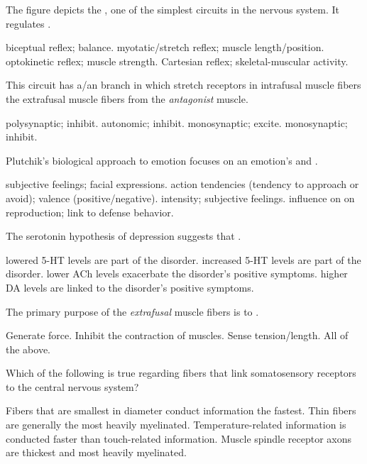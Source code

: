 \documentclass[answers]{exam}
\begin{document}
\begin{questions}

\question The figure depicts the \fillin, one of the simplest circuits in the nervous system. It regulates \fillin.
\begin{choices}
\choice biceptual reflex; balance.
\correctchoice myotatic/stretch reflex; muscle length/position.
\choice optokinetic reflex; muscle strength.
\choice Cartesian reflex; skeletal-muscular activity.
\end{choices}

\question This circuit has a/an \fillin branch in which stretch receptors in intrafusal muscle fibers \fillin the extrafusal muscle fibers from the \emph{antagonist} muscle.
\begin{choices}
\correctchoice polysynaptic; inhibit.
\choice autonomic; inhibit.
\choice monosynaptic; excite.
\choice monosynaptic; inhibit.
\end{choices}

\newpage

\question Plutchik's biological approach to emotion focuses on an emotion's \fillin and \fillin.
\begin{choices}
\choice subjective feelings; facial expressions.
\correctchoice action tendencies (tendency to approach or avoid); valence (positive/negative).
\choice intensity; subjective feelings.
\choice influence on on reproduction; link to defense behavior.
\end{choices}

\question The serotonin hypothesis of depression suggests that \fillin.
\begin{choices}
\correctchoice lowered 5-HT levels are part of the disorder.
\choice increased 5-HT levels are part of the disorder.
\choice lower ACh levels exacerbate the disorder's positive symptoms.
\choice higher DA levels are linked to the disorder's positive symptoms.
\end{choices}

\question The primary purpose of the \emph{extrafusal} muscle fibers is to \fillin.
\begin{choices}
\correctchoice Generate force.
\choice Inhibit the contraction of muscles.
\choice Sense tension/length.
\choice All of the above.
\end{choices}

\question Which of the following is true regarding fibers that link somatosensory receptors to the central nervous system?
\begin{choices}
\choice Fibers that are smallest in diameter conduct information the fastest.
\choice Thin fibers are generally the most heavily myelinated.
\choice Temperature-related information is conducted faster than touch-related information.
\correctchoice Muscle spindle receptor axons are thickest and most heavily myelinated.
\end{choices}


\end{questions}
\end{document}
